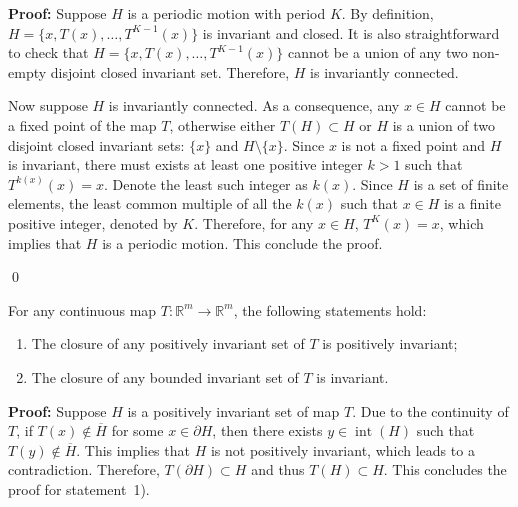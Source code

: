 \documentclass[10pt]{svmult}
\newcommand{\QED}{\begin{flushright}\qed \end{flushright}}
\newcommand{\intr}{\operatorname{int}}
\begin{document}
\textbf{Proof:} Suppose $H$ is a periodic motion with period $K$. By definition, $H=\{x,T(x),\dots,T^{K-1}(x)\}$ is invariant and closed. It is also straightforward to check that $H=\{x,T(x),\dots,T^{K-1}(x)\}$ cannot be a union of any two non-empty disjoint closed invariant set. Therefore, $H$ is invariantly connected.

Now suppose $H$ is invariantly connected. As a consequence, any $x\in H$ cannot be a fixed point of the map $T$, otherwise either $T(H)\subset H$ or $H$ is a union of two disjoint closed invariant sets: $\{x\}$ and $H\setminus \{x\}$. Since $x$ is not a fixed point and $H$ is invariant, there must exists at least one positive integer $k>1$ such that $T^{k(x)}(x)=x$. Denote the least such integer as $k(x)$. Since $H$ is a set of finite elements, the least common multiple of all the $k(x)$ such that $x\in H$ is a finite positive integer, denoted by $K$. Therefore, for any $x\in H$, $T^K(x)=x$, which implies that $H$ is a periodic motion. This conclude the proof.\QED


\begin{lemma}\label{lem:inv-set-closure}
For any continuous map $T:\mathbb{R}^m \to \mathbb{R}^m$, the following statements hold:
\begin{enumerate}[label={\arabic*)}]
\item The closure of any positively invariant set of $T$ is positively invariant;
\item The closure of any bounded invariant set of $T$ is invariant. 
\end{enumerate}
\end{lemma}

\textbf{Proof:} Suppose $H$ is a positively invariant set of map $T$. Due to the continuity of $T$, if $T(x)\notin \overline{H}$ for some $x\in \partial H$, then there exists $y\in \intr(H)$ such that $T(y)\notin \overline{H}$. This implies that $H$ is not positively invariant, which leads to a contradiction. Therefore, $T(\partial H)\subset H$ and thus $T(H)\subset H$. This concludes the proof for statement~1).
\end{document}
